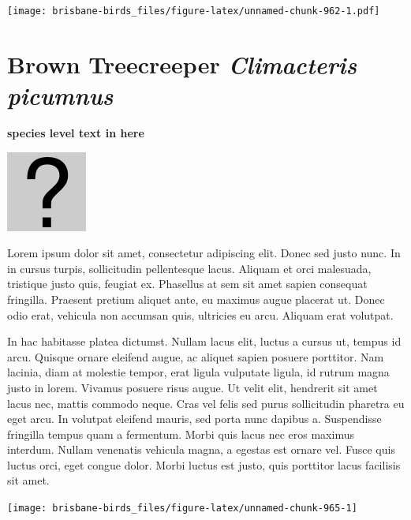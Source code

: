 \documentclass[]{book}
\let\origfigure\figure
\let\endorigfigure\endfigure
\renewenvironment{figure}[1][2] {
  \expandafter\origfigure\expandafter[H]
} {
  \endorigfigure
}
\begin{document}
\begin{figure}
\centering
\texttt{[image: brisbane-birds\_files/figure-latex/unnamed-chunk-962-1.pdf]}
\caption{\label{fig:unnamed-chunk-962}insert figure caption}
\end{figure}

\section{\texorpdfstring{Brown Treecreeper \emph{Climacteris
picumnus}}{Brown Treecreeper Climacteris picumnus}}\label{brown-treecreeper-climacteris-picumnus}

\textbf{species level text in here}

\begin{figure}
\centering
\includegraphics{assets/missing.png}
\caption{No image for species}
\end{figure}

Lorem ipsum dolor sit amet, consectetur adipiscing elit. Donec sed justo
nunc. In in cursus turpis, sollicitudin pellentesque lacus. Aliquam et
orci malesuada, tristique justo quis, feugiat ex. Phasellus at sem sit
amet sapien consequat fringilla. Praesent pretium aliquet ante, eu
maximus augue placerat ut. Donec odio erat, vehicula non accumsan quis,
ultricies eu arcu. Aliquam erat volutpat.

In hac habitasse platea dictumst. Nullam lacus elit, luctus a cursus ut,
tempus id arcu. Quisque ornare eleifend augue, ac aliquet sapien posuere
porttitor. Nam lacinia, diam at molestie tempor, erat ligula vulputate
ligula, id rutrum magna justo in lorem. Vivamus posuere risus augue. Ut
velit elit, hendrerit sit amet lacus nec, mattis commodo neque. Cras vel
felis sed purus sollicitudin pharetra eu eget arcu. In volutpat eleifend
mauris, sed porta nunc dapibus a. Suspendisse fringilla tempus quam a
fermentum. Morbi quis lacus nec eros maximus interdum. Nullam venenatis
vehicula magna, a egestas est ornare vel. Fusce quis luctus orci, eget
congue dolor. Morbi luctus est justo, quis porttitor lacus facilisis sit
amet.

\begin{figure}
\texttt{[image: brisbane-birds\_files/figure-latex/unnamed-chunk-965-1]} \caption{insert figure caption}\label{fig:unnamed-chunk-965}
\end{figure}
\end{document}

